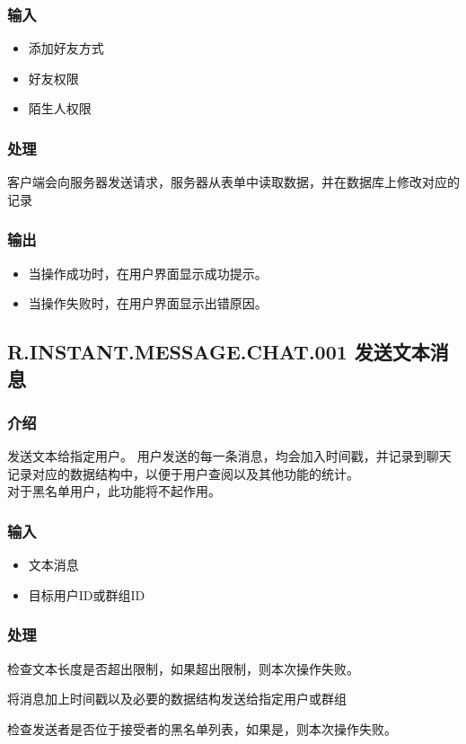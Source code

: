 {\subsubsection{输入}
\begin{itemize}
	\item 添加好友方式
	\item 好友权限
	\item 陌生人权限
\end{itemize}
\subsubsection{处理}
客户端会向服务器发送请求，服务器从表单中读取数据，并在数据库上修改对应的记录
\subsubsection{输出}
\begin{itemize}
	\item 当操作成功时，在用户界面显示成功提示。
	\item 当操作失败时，在用户界面显示出错原因。
\end{itemize}
}


\subsection{R.INSTANT.MESSAGE.CHAT.001 发送文本消息}
\subsubsection{介绍}
发送文本给指定用户。
{
	\color{red}
	用户发送的每一条消息，均会加入时间戳，并记录到聊天记录对应的数据结构中，以便于用户查阅以及其他功能的统计。\\
	对于黑名单用户，此功能将不起作用。
}

\subsubsection{输入}
\begin{itemize}
	\item 文本消息
	\item 目标用户ID或群组ID
\end{itemize}

\subsubsection{处理}
\begin{enumerate}
	\item 检查文本长度是否超出限制，如果超出限制，则本次操作失败。
	\item 将消息加上时间戳以及必要的数据结构发送给指定用户或群组
	{
		\color{red}
		\item 检查发送者是否位于接受者的黑名单列表，如果是，则本次操作失败。
	}
	\end{enumerate}

